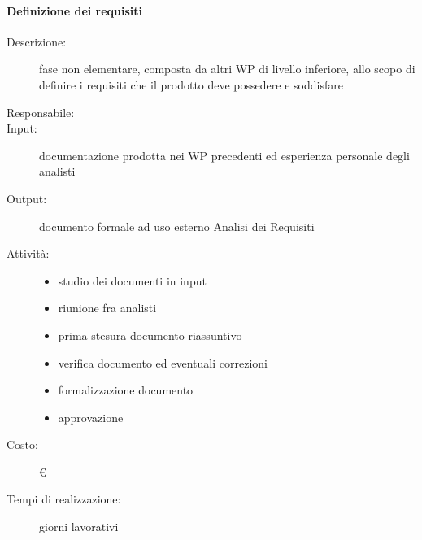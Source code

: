 \paragraph{Definizione dei requisiti}
\begin{description}
\item[Descrizione:] fase non elementare, composta da altri WP di livello inferiore, allo scopo di definire i requisiti che il prodotto deve possedere e soddisfare

\item[Responsabile:] 

\item[Input:] documentazione prodotta nei WP precedenti ed esperienza personale degli
analisti

\item[Output:] documento formale ad uso esterno Analisi dei Requisiti

\item[Attività:]
\begin{itemize}
\item studio dei documenti in input
\item riunione fra analisti
\item prima stesura documento riassuntivo
\item verifica documento ed eventuali correzioni
\item formalizzazione documento
\item approvazione
\end{itemize}
\item[Costo:] \euro 
\item[Tempi di realizzazione:]  giorni lavorativi
\end{description}



